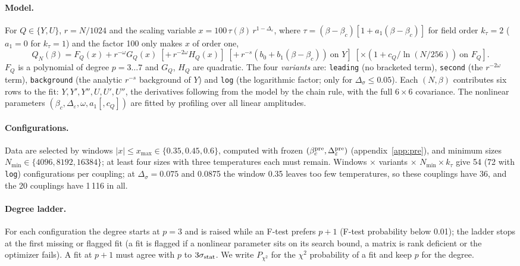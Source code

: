 \documentclass[10pt,a4paper]{article}
\newcommand{\Ds}{\Delta_\sigma}
\newcommand{\De}{\Delta_\varepsilon}
\newcommand{\code}[1]{\texttt{#1}}
\newcommand{\sstat}{\sigma_{\rm stat}}
\newcommand{\ktau}{k_\tau}
\begin{document}
\paragraph{Model.} For $Q\in\{Y,U\}$, $r=N/1024$ and the scaling variable $x=100\,\tau(\beta)\,r^{1-\De}$, where
$\tau=(\beta-\beta_c)[1+a_1(\beta-\beta_c)]$ for field order $\ktau=2$ ($a_1=0$ for $\ktau=1$) and the factor 100 only makes $x$ of order one,
\begin{equation}
 Q_N(\beta)=F_Q(x)+r^{-\omega}G_Q(x)\;[+\,r^{-2\omega}H_Q(x)]\;[+\,r^{-s}(b_0+b_1(\beta-\beta_c))\ \text{on }Y]\;[\times(1+c_Q/\ln(N/256))\ \text{on }F_Q].
\end{equation}
$F_Q$ is a polynomial of degree $p=3\dots7$ and $G_Q$, $H_Q$ are quadratic. The four \emph{variants} are: \code{leading} (no bracketed term),
\code{second} (the $r^{-2\omega}$ term), \code{background} (the analytic $r^{-s}$ background of $Y$) and \code{log} (the logarithmic factor;
only for $\Ds\le0.05$). Each $(N,\beta)$ contributes six rows to the fit: $Y,Y',Y'',U,U',U''$, the derivatives following from the model by the
chain rule, with the full $6\times6$ covariance. The nonlinear parameters $(\beta_c,\De,\omega,a_1[,c_Q])$ are fitted by profiling over all
linear amplitudes.

\paragraph{Configurations.} Data are selected by windows $|x|\le x_{\max}\in\{0.35,0.45,0.6\}$, computed with frozen $(\beta_c^{\rm
pre},\De^{\rm pre})$ (appendix~\ref{app:pre}), and minimum sizes $N_{\min}\in\{4096,8192,16384\}$; at least four sizes with three temperatures
each must remain. Windows $\times$ variants $\times$ $N_{\min}\times\ktau$ give 54 (72 with \code{log}) configurations per coupling; at $\Ds=0.075$ and 0.0875 the
window 0.35 leaves too few temperatures, so these couplings have 36, and the 20 couplings have 1\,116 in all.

\paragraph{Degree ladder.} For each configuration the degree starts at $p=3$ and is raised while an F-test prefers $p+1$ (F-test probability below 0.01); the ladder
stops at the first missing or flagged fit (a fit is flagged if a nonlinear parameter sits on its search bound, a matrix is rank deficient or the
optimizer fails). A fit at $p+1$ must agree with $p$ to $3\sstat$. We write $P_{\chi^2}$ for the $\chi^2$ probability of a fit and keep $p$ for
the degree.
\end{document}
